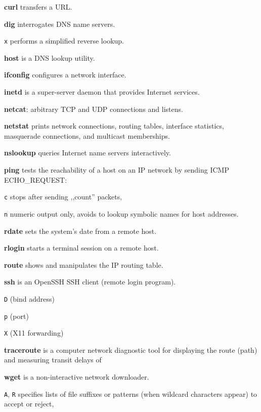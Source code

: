 \begin{enumx}
\item [\cmd] \textbf{curl} transfers a URL.
\item [\cmd] \textbf{dig} interrogates DNS name servers.                        
\item [\texttt{x}] performs a simplified reverse lookup. 
\item [\cmd] \textbf{host} is a DNS lookup utility.  
\item [\cmd] \textbf{ifconfig} configures a network interface.   
\item [\cmd] \textbf{inetd} is a super-server daemon that provides Internet services.
\item [\cmd] \textbf{netcat}: arbitrary TCP and UDP connections and listens.
\item [\cmd] \textbf{netstat} prints network connections, routing tables, 
interface statistics, masquerade connections, and multicast memberships.
\item [\cmd] \textbf{nslookup} queries Internet name servers interactively.
\item [\cmd] \textbf{ping} tests the reachability of a host 
on an IP network by sending ICMP ECHO\_REQUEST:
\item [\texttt{c}] stops after sending ,,count'' packets,
\item [\texttt{n}] numeric output only, 
	avoids to lookup symbolic names for host addresses. 
\item [\cmd] \textbf{rdate} sets the system's date from a remote host.
\item [\cmd] \textbf{rlogin} starts a terminal session on a remote host.
\item [\cmd] \textbf{route} shows and manipulates the IP routing table.
\item [\cmd] \textbf{ssh} is an OpenSSH SSH client (remote login program).
\item [\texttt{D}] (bind address)
\item [\texttt{p}] (port)
\item [\texttt{X}] (X11 forwarding)
\item [\cmd] \textbf{traceroute} is a computer network diagnostic tool for 
displaying the route (path) and measuring transit delays of 
\item [\cmd] \textbf{wget} is a non-interactive network downloader.
\item [\texttt{A}, \texttt{R}] specifies lists 	of file suffixes or 
	patterns (when wildcard characters appear) to accept or reject,

\end{enumx}
